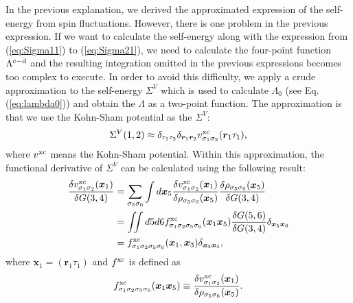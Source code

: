 In the previous explanation, we derived the approximated expression of the self-energy from spin fluctuations.
However, there is one problem in the previous expression.
If we want to calculate the self-energy along with the expression from (\ref{eq:Sigma11}) to (\ref{eq:Sigma21}), 
we need to calculate the four-point function $\Lambda^{\rm c - \rm d}$ and the resulting integration omitted in the previous expressions becomes 
too complex to execute.
In order to avoid this difficulty, we apply a crude approximation to the
self-energy $\Sigma^{V}$ which is used to calculate $\Lambda_0$ (see Eq.(\ref{eq:lambda0})) and obtain the $\Lambda$ as a two-point function.
The approximation is that we use the Kohn-Sham potential as the $\Sigma^{V}$\cite{Sole1994}:
%
\begin{equation}
	\Sigma^{V}(1,2) \approx \delta_{\tau_1\tau_2}\delta_{\bm r_1\bm r_2}
	v^{\rm xc}_{\sigma_1\sigma_2}(\bm r_1 \tau_1),
	\label{eq:localapp}
\end{equation}
%
where $v^{\rm xc}$ means the Kohn-Sham potential.
Within this approximation, the functional derivative of $\Sigma^{V}$
can be calculated using the following result:
%
\begin{equation}
\begin{split}
	\frac{\delta v^{\rm xc}_{\sigma_1\sigma_2}(\bm x_1)}{\delta G(3,4)}
	&= \sum_{\sigma_5\sigma_6} \int d{\bm x}_5 
	\frac{\delta v^{\rm xc}_{\sigma_1\sigma_2}(\bm x_1)}{\delta\rho_{\sigma_5\sigma_6}(\bm x_5)}
	\frac{\delta\rho_{\sigma_5\sigma_6}(\bm x_5)}{\delta G(3,4)} \\
	&= \iint d5d6 f^{\rm xc}_{\sigma_1\sigma_2\sigma_5\sigma_6}(\bm x_1 \bm x_5)
	\frac{\delta G(5,6)}{\delta G(3,4)}\delta_{\bm x_5\bm x_6} \\
	&= f^{\rm xc}_{\sigma_1\sigma_2\sigma_5\sigma_6}(\bm x_1, \bm x_3)\delta_{\bm x_3 \bm x_4},
	\label{eq:dervxc}
\end{split}
\end{equation}
%
where $\bm x_1 = (\bm r_1 \tau_1)$ and $f^{\rm xc}$ is defined as
%
\begin{equation}
	f^{\rm xc}_{\sigma_1\sigma_2\sigma_5\sigma_6}(\bm x_1 \bm x_5)
	\equiv 
	\frac{\delta v^{\rm xc}_{\sigma_1\sigma_2}(\bm x_1)}{\delta\rho_{\sigma_5\sigma_6}(\bm x_5)}.
	\label{eq:deffxc}
\end{equation}
%

